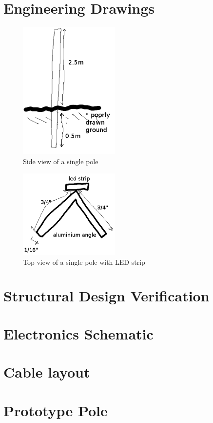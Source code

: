 \documentclass[12pt]{article} %
\begin{document}
\clearpage
\begin{appendices}
\section{Engineering Drawings}
\label{app:engdrawings}

\begin{figure}[h]
    \centering
    \includegraphics[width=5cm]{diags/sidepole.png}
    \caption{Side view of a single pole}
\end{figure}

\begin{figure}[h]
    \centering
    \includegraphics[width=5cm]{diags/toppole.png}
    \caption{Top view of a single pole with LED strip}
\end{figure}

\section{Structural Design Verification}

\section{Electronics Schematic}

\section{Cable layout}

\section{Prototype Pole}

\end{appendices}
\end{document}
